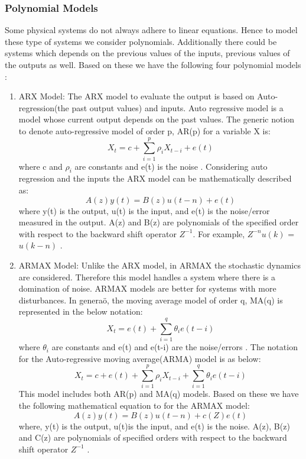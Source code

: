 \documentclass[article,type=msc,colorback,12pt,accentcolor=tud7b,table]{tudthesis}
\begin{document}
\subsubsection{Polynomial Models}
	
	Some physical systems do not always adhere to linear equations. Hence to model these type of systems we consider polynomials. Additionally there could be systems which depends on the previous values of the inputs, previous values of the outputs as well. Based on these we have the following four polynomial models \cite{ljung1998system}:
	
	\begin{enumerate}
		\item{ARX Model:} The ARX model to evaluate the output is based on Auto-regression(the past output values) and inputs. Auto regressive model is a model whose current output depends on the past values. The generic notion to denote auto-regressive model of order p, AR(p) for a variable X is: $$ X_t = c + \sum_{i=1}^{p} \rho_i X_{t-i} + e(t) $$ where c and $ \rho_i $ are constants and e(t) is the noise \cite{arma}. Considering auto regression and the inputs the ARX model can be mathematically described as: $$ A(z) y(t) = B(z) u(t-n) + e(t) $$ where y(t) is the output, u(t) is the input, and e(t) is the noise/error measured in the output. A(z) and B(z) are polynomials of the specified order with respect to the backward shift operator $Z^{-1}$. For example, $Z^{-n}  u(k)$ = $u(k-n)$ \cite{arx}.
		
	\item{ARMAX Model:} Unlike the ARX model, in ARMAX the stochastic dynamics are considered. Therefore this model handles a system where there is a domination of noise. ARMAX models are better for systems with more disturbances. In generaö, the moving average model of order q, MA(q) is represented in the below notation: $$ X_t =  e(t) + \sum_{i=1}^{q} \theta_i e(t-i) $$ where $ \theta_i $ are constants and e(t) and e(t-i) are the noise/errors \cite{arma}. The notation for the Auto-regressive moving average(ARMA) model is as below: $$ X_t = c + e(t) + \sum_{i=1}^{p} \rho_i X_{t-i} + \sum_{i=1}^{q} \theta_i e(t-i) $$ This model includes both AR(p) and MA(q) models. Based on these we have the following mathematical equation to for the ARMAX model: $$ A(z) y(t) = B(z) u(t-n) + c(Z) e(t) $$ where, y(t) is the output, u(t)is the input, and e(t) is the noise. A(z), B(z) and C(z) are polynomials of specified orders with respect to the backward shift operator $Z^{-1}$ \cite{armax}. 
	

\end{enumerate}
\end{document}
